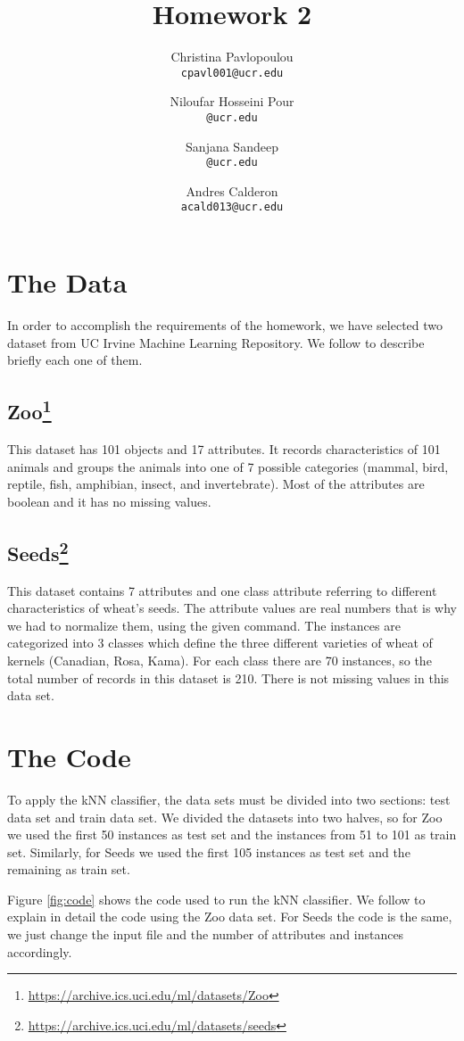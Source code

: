 \documentclass[10pt]{scrartcl}
\title{Homework 2}
\author{
   Christina Pavlopoulou\\
  \small \texttt{cpavl001@ucr.edu}
  \and
   Niloufar Hosseini Pour\\
  \small \texttt{@ucr.edu}
  \and
   Sanjana Sandeep \\
  \small \texttt{@ucr.edu}
  \and
   Andres Calderon\\
  \small \texttt{acald013@ucr.edu}
}
\begin{document}
\tiny
\maketitle
\normalsize

\section{The Data}
In order to accomplish the requirements of the homework, we have selected two dataset from UC Irvine Machine Learning Repository\cite{repo}.  We follow to describe briefly each one of them.

\subsection[Zoo]{Zoo\footnote{\url{https://archive.ics.uci.edu/ml/datasets/Zoo}}}
This dataset has 101 objects and 17 attributes. It records characteristics of 101 animals and groups the animals into one of 7 possible categories (mammal, bird, reptile, fish,
amphibian, insect, and invertebrate). Most of the attributes are boolean and it has no missing values.

\subsection[Seeds]{Seeds\footnote{\url{https://archive.ics.uci.edu/ml/datasets/seeds}}}\label{sec:seeds}
This dataset contains 7 attributes and one class attribute referring to different characteristics of wheat's seeds.  The attribute values are real numbers that is why we had to normalize them, using the given command. The instances are categorized into 3 classes which define the three different varieties of wheat of kernels (Canadian, Rosa, Kama). For each class there are 70 instances, so the total number of records in this dataset is 210. There is not missing values in this data set.

\section{The Code}
To apply the kNN classifier, the data sets must be divided into two sections: test data set and train data set.  We divided the datasets into two halves, so for Zoo we used the first 50 instances as test set and the instances from 51 to 101 as train set.  Similarly, for Seeds we used the first 105 instances as test set and the remaining as train set.  

Figure \ref{fig:code} shows the code used to run the kNN classifier.  We follow to explain in detail the code using the Zoo data set.  For Seeds the code is the same, we just change the input file and the number of attributes and instances accordingly.
\end{document}
